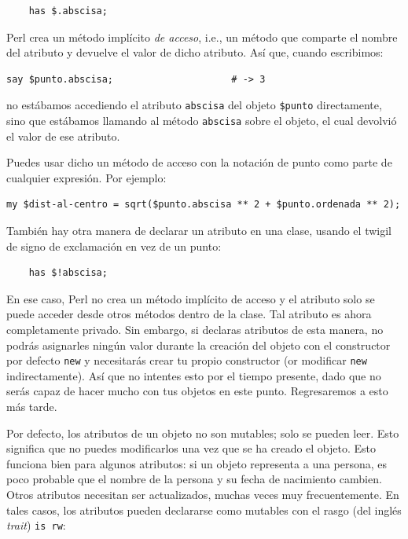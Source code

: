 \begin{verbatim}
    has $.abscisa;  
\end{verbatim}
%
Perl crea un método implícito \emph{de acceso}, i.e., un método
que comparte el nombre del atributo y devuelve el valor de dicho
atributo. Así que, cuando escribimos:

\begin{verbatim}
say $punto.abscisa;                     # -> 3
\end{verbatim}
%
no estábamos accediendo el atributo {\tt abscisa} del objeto
\verb|$punto| directamente, sino que estábamos llamando al método
{\tt abscisa} sobre el objeto, el cual devolvió el valor de ese
atributo.


Puedes usar dicho un método de acceso con la notación de punto
como parte de cualquier expresión. Por ejemplo:

\begin{verbatim}
my $dist-al-centro = sqrt($punto.abscisa ** 2 + $punto.ordenada ** 2);
\end{verbatim}
%

También hay otra manera de declarar un atributo en una clase, 
usando el twigil de signo de exclamación en vez de un punto:

\begin{verbatim}
    has $!abscisa;  
\end{verbatim}
%
En ese caso, Perl no crea un método implícito de acceso 
y el atributo solo se puede acceder desde otros métodos
dentro de la clase. Tal atributo es ahora completamente privado. 
Sin embargo, si declaras atributos de esta manera, no podrás
asignarles ningún valor durante la creación del objeto con el 
constructor por defecto {\tt new} y necesitarás crear tu propio
constructor (or modificar {\tt new} indirectamente). Así que no
intentes esto por el tiempo presente, dado que no serás capaz
de hacer mucho con tus objetos en este punto. Regresaremos a esto 
más tarde.

Por defecto, los atributos de un objeto no son mutables; solo
se pueden leer. Esto significa que no puedes modificarlos una vez que 
se ha creado el objeto. Esto funciona bien para algunos atributos: si
un objeto representa a una persona, es poco probable que el nombre 
de la persona y su fecha de nacimiento cambien. Otros atributos necesitan
ser actualizados, muchas veces muy frecuentemente. En tales casos, los
atributos pueden declararse como mutables con el rasgo (del inglés \emph{trait})
 {\tt is rw}:

